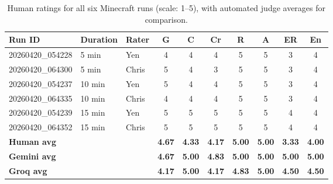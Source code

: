 \documentclass[11pt]{article}
\begin{document}
\begin{table}[h]
\centering
\caption{Human ratings for all six Minecraft runs (scale: 1--5), with automated judge averages for comparison.}
\label{tab:human_scores}
\begin{tabular}{lllccccccc}
\toprule
Run ID & Duration & Rater & G & C & Cr & R & A & ER & En \\
\midrule
20260420\_054228 & 5 min  & Yen   & 4 & 4 & 4 & 5 & 5 & 3 & 4 \\
20260420\_064300 & 5 min  & Chris & 5 & 4 & 3 & 5 & 5 & 3 & 4 \\
20260420\_054237 & 10 min & Yen   & 5 & 4 & 4 & 5 & 5 & 3 & 4 \\
20260420\_064335 & 10 min & Chris & 4 & 4 & 4 & 5 & 5 & 3 & 4 \\
20260420\_054239 & 15 min & Yen   & 5 & 5 & 5 & 5 & 5 & 4 & 4 \\
20260420\_064352 & 15 min & Chris & 5 & 5 & 5 & 5 & 5 & 4 & 4 \\
\midrule
\textbf{Human avg}  & & & \textbf{4.67} & \textbf{4.33} & \textbf{4.17} & \textbf{5.00} & \textbf{5.00} & \textbf{3.33} & \textbf{4.00} \\
\textbf{Gemini avg} & & & \textbf{4.67} & \textbf{5.00} & \textbf{4.83} & \textbf{5.00} & \textbf{5.00} & \textbf{5.00} & \textbf{5.00} \\
\textbf{Groq avg}   & & & \textbf{4.17} & \textbf{5.00} & \textbf{4.17} & \textbf{4.83} & \textbf{5.00} & \textbf{4.50} & \textbf{4.50} \\
\bottomrule
\end{tabular}
\end{table}
\end{document}
